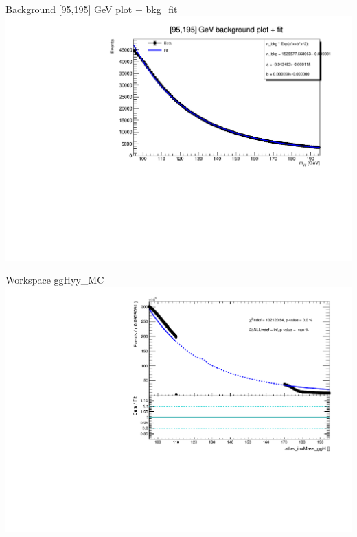 \documentclass[10pt,UKenglish, leqno, xcolor = dvipsnames]{beamer}
\begin{document}
		\begin{frame}{Background [95,195] GeV plot + bkg\_fit}
			\vfill
			\includegraphics[width=1.\textwidth]{../images/background_95_195GeV_fit.pdf}
			\vfill
		\end{frame}
	
		\begin{frame}{Workspace ggHyy\_MC}
			\vfill
			\includegraphics[width=1.\textwidth]{../images/ggHyy_MC.pdf}
			\vfill
		\end{frame}
		
\end{document}
